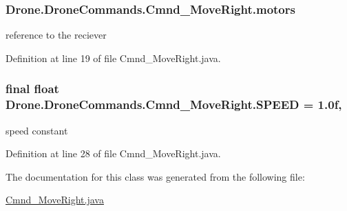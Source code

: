 \subsubsection[{motors}]{ Drone.\+Drone\+Commands.\+Cmnd\+\_\+\+Move\+Right.\+motors\hspace{0.3cm}{\ttfamily [private]}}\label{class_drone_1_1_drone_commands_1_1_cmnd___move_right_aca0fa5bb4d8bf88a06b0b719c926cc11}
reference to the reciever 

Definition at line 19 of file Cmnd\+\_\+\+Move\+Right.\+java.

\hypertarget{class_drone_1_1_drone_commands_1_1_cmnd___move_right_ad24d6f9b6f2c1899b80c9cc90941d8e2}{}
\subsubsection[{S\+P\+E\+E\+D}]{\setlength{\rightskip}{0pt plus 5cm}final float Drone.\+Drone\+Commands.\+Cmnd\+\_\+\+Move\+Right.\+S\+P\+E\+E\+D = 1.\+0f\hspace{0.3cm}{\ttfamily [static]}, {\ttfamily [private]}}\label{class_drone_1_1_drone_commands_1_1_cmnd___move_right_ad24d6f9b6f2c1899b80c9cc90941d8e2}
speed constant 

Definition at line 28 of file Cmnd\+\_\+\+Move\+Right.\+java.



The documentation for this class was generated from the following file\+:\begin{DoxyCompactItemize}
\item 
\hyperlink{_cmnd___move_right_8java}{Cmnd\+\_\+\+Move\+Right.\+java}\end{DoxyCompactItemize}
